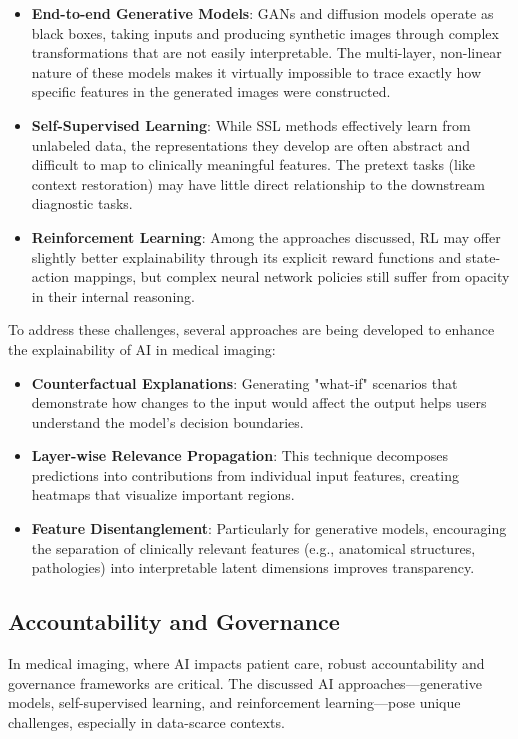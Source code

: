 \documentclass{article}
\begin{document}
\begin{itemize}
    \item \textbf{End-to-end Generative Models}: GANs and diffusion models operate as black boxes, taking inputs and producing synthetic images through complex transformations that are not easily interpretable. The multi-layer, non-linear nature of these models makes it virtually impossible to trace exactly how specific features in the generated images were constructed.
    
    \item \textbf{Self-Supervised Learning}: While SSL methods effectively learn from unlabeled data, the representations they develop are often abstract and difficult to map to clinically meaningful features. The pretext tasks (like context restoration) may have little direct relationship to the downstream diagnostic tasks.
    
    \item \textbf{Reinforcement Learning}: Among the approaches discussed, RL may offer slightly better explainability through its explicit reward functions and state-action mappings, but complex neural network policies still suffer from opacity in their internal reasoning.
\end{itemize}

To address these challenges, several approaches are being developed to enhance the explainability of AI in medical imaging:

\begin{itemize}
    
    \item \textbf{Counterfactual Explanations}: Generating "what-if" scenarios that demonstrate how changes to the input would affect the output helps users understand the model's decision boundaries.
    
    \item \textbf{Layer-wise Relevance Propagation}: This technique decomposes predictions into contributions from individual input features, creating heatmaps that visualize important regions.
    
    \item \textbf{Feature Disentanglement}: Particularly for generative models, encouraging the separation of clinically relevant features (e.g., anatomical structures, pathologies) into interpretable latent dimensions improves transparency.
\end{itemize}


\subsection{Accountability and Governance}
In medical imaging, where AI impacts patient care, robust accountability and governance frameworks are critical. The discussed AI approaches—generative models, self-supervised learning, and reinforcement learning—pose unique challenges, especially in data-scarce contexts.
\end{document}
